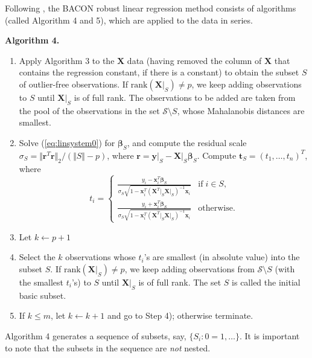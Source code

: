 \documentclass[a4paper,oneside,11pt,DIV=12]{scrartcl}
\begin{document}
Following \citet{billor_hadi_etal_2000}, the BACON robust linear regression method consists of algorithms (called Algorithm 4 and 5), which are applied to the data in series. 

\vspace{1em}
\noindent \textbf{\sffamily Algorithm 4.}  
\begin{enumerate}[Step 1)]
	\item Apply Algorithm 3 to the $\bm X$ data (having removed the column of $\bm X$ that contains the regression constant, if there is a constant) to obtain the subset $S$ of outlier-free observations. If $\mathrm{rank}(\bm X\vert_S) \neq p$, we keep adding observations to $S$ until $\bm X \vert_S$ is of full rank. The observations to be added are taken from the pool of the observations in the set $\mathscr{S} \setminus S$, whose Mahalanobis distances are smallest.
	\item Solve (\ref{eq:linsystem0}) for $\bm \beta_S$, and compute the residual scale $\sigma_S = \Vert \bm r^T \bm r \Vert_2 / (\Vert S\Vert - p)$, where $\bm r = \bm y \vert_S - \bm X\vert_S \bm \beta_S$. Compute $\bm t_S=(t_1, \ldots, t_n)^T$, where
	\begin{equation}\label{eq:tis0}
		t_i = \begin{cases}
			\displaystyle{\frac{y_i - \bm x_i^T \bm \beta_S}{\sigma_S \sqrt{1 - \bm x_i^T (\bm X^T \vert_S \bm X \vert_S)^{-1}\bm x_i}}} & \text{if} \; i \in S,\\
			\displaystyle{\frac{y_i + \bm x_i^T \bm \beta_S}{\sigma_S \sqrt{1 - \bm x_i^T (\bm X^T \vert_S \bm X \vert_S)^{-1}\bm x_i}}} & \text{otherwise}.
		\end{cases}
	\end{equation}
	\item Let $k \gets p + 1$ 
	\item Select the $k$ observations whose $t_i$'s are smallest (in absolute value) into the subset $S$. If $\mathrm{rank}(\bm X \vert_S)\neq p$, we keep adding observations from $\mathscr{S} \setminus S$ (with the smallest $t_i$'s) to $S$ until $\bm X \vert_S$ is of full rank. The set $S$ is called the initial basic subset.
	\item If $k \leq m$, let $k \gets k + 1$ and go to Step 4); otherwise terminate. 
\end{enumerate}

Algorithm 4 generates a sequence of subsets, say, $\{S_i : 0=1, \ldots\}$. It is important to note that the subsets in the sequence are \textit{not} nested.
\end{document}
